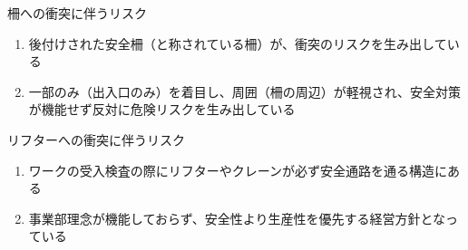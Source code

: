 \begin{Issues}{柵への衝突に伴うリスク}
\begin{enumerate}[label=\sarrow]
\item 後付けされた安全柵（と称されている柵）が、衝突のリスクを生み出している
\item 一部のみ（出入口のみ）を着目し、周囲（柵の周辺）が軽視され、安全対策が機能せず反対に危険リスクを生み出している
\end{enumerate}
\end{Issues}
\begin{Issues}{リフターへの衝突に伴うリスク}
\begin{enumerate}[label=\sarrow]
\item ワークの受入検査の際にリフターやクレーンが必ず安全通路を通る構造にある
\item {}事業部理念が機能しておらず、安全性より生産性を優先する経営方針となっている
\end{enumerate}
\end{Issues}


